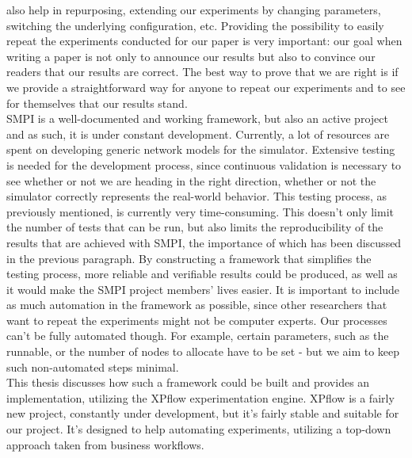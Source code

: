 also help in repurposing, extending our experiments by changing
parameters, switching the underlying configuration, etc. Providing the
possibility to easily repeat the experiments conducted for our paper
is very important: our goal when writing a paper is not only to
announce our results but also to convince our readers that our results
are correct.\cite{m10} The best way to prove that we are right is if
we provide a straightforward way for anyone to repeat our experiments
and to see for themselves that our results stand.\\
SMPI is a well-documented and working framework, but also an active
project and as such, it is under constant development. Currently, a
lot of resources are spent on developing generic network models for
the simulator. Extensive testing is needed for the development
process, since continuous validation is necessary to see whether or
not we are heading in the right direction, whether or not the
simulator correctly represents the real-world behavior. This
testing process, as previously mentioned, is currently very
time-consuming. This doesn't only limit the number of tests that can
be run, but also limits the reproducibility of the
results that are achieved with SMPI, the importance of which has been
discussed in the previous paragraph. By constructing a framework that
simplifies the testing process, more reliable and verifiable results
could be produced, as well as it would make the SMPI project members'
lives easier. It is important to include as much automation in the
framework as possible, since other researchers that want to repeat the
experiments might not be computer experts. Our processes can't be
fully automated though. For example, certain parameters, such as the
runnable, or the number of nodes to allocate have to be set - but we
aim to keep such non-automated steps minimal.\\
This thesis discusses how such a framework could be built and provides
an implementation, utilizing the XPflow\cite{bn12_2} experimentation
engine. XPflow is a fairly new project, constantly under development,
but it's fairly stable and suitable for our project. It's designed to
help automating experiments, utilizing a top-down approach taken from
business workflows.

